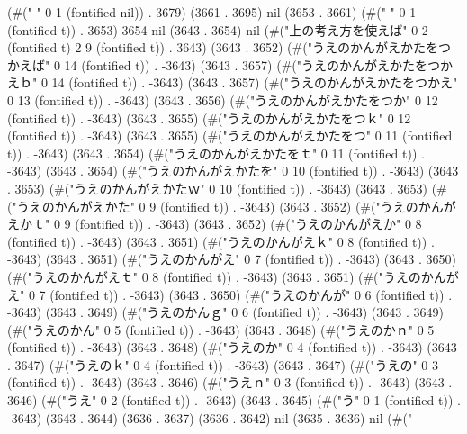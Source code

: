 (#("	" 0 1 (fontified nil)) . 3679) (3661 . 3695) nil (3653 . 3661) (#(" " 0 1 (fontified t)) . 3653) 3654 nil (3643 . 3654) nil (#("上の考え方を使えば" 0 2 (fontified t) 2 9 (fontified t)) . 3643) (3643 . 3652) (#("うえのかんがえかたをつかえば" 0 14 (fontified t)) . -3643) (3643 . 3657) (#("うえのかんがえかたをつかえｂ" 0 14 (fontified t)) . -3643) (3643 . 3657) (#("うえのかんがえかたをつかえ" 0 13 (fontified t)) . -3643) (3643 . 3656) (#("うえのかんがえかたをつか" 0 12 (fontified t)) . -3643) (3643 . 3655) (#("うえのかんがえかたをつｋ" 0 12 (fontified t)) . -3643) (3643 . 3655) (#("うえのかんがえかたをつ" 0 11 (fontified t)) . -3643) (3643 . 3654) (#("うえのかんがえかたをｔ" 0 11 (fontified t)) . -3643) (3643 . 3654) (#("うえのかんがえかたを" 0 10 (fontified t)) . -3643) (3643 . 3653) (#("うえのかんがえかたｗ" 0 10 (fontified t)) . -3643) (3643 . 3653) (#("うえのかんがえかた" 0 9 (fontified t)) . -3643) (3643 . 3652) (#("うえのかんがえかｔ" 0 9 (fontified t)) . -3643) (3643 . 3652) (#("うえのかんがえか" 0 8 (fontified t)) . -3643) (3643 . 3651) (#("うえのかんがえｋ" 0 8 (fontified t)) . -3643) (3643 . 3651) (#("うえのかんがえ" 0 7 (fontified t)) . -3643) (3643 . 3650) (#("うえのかんがえｔ" 0 8 (fontified t)) . -3643) (3643 . 3651) (#("うえのかんがえ" 0 7 (fontified t)) . -3643) (3643 . 3650) (#("うえのかんが" 0 6 (fontified t)) . -3643) (3643 . 3649) (#("うえのかんｇ" 0 6 (fontified t)) . -3643) (3643 . 3649) (#("うえのかん" 0 5 (fontified t)) . -3643) (3643 . 3648) (#("うえのかｎ" 0 5 (fontified t)) . -3643) (3643 . 3648) (#("うえのか" 0 4 (fontified t)) . -3643) (3643 . 3647) (#("うえのｋ" 0 4 (fontified t)) . -3643) (3643 . 3647) (#("うえの" 0 3 (fontified t)) . -3643) (3643 . 3646) (#("うえｎ" 0 3 (fontified t)) . -3643) (3643 . 3646) (#("うえ" 0 2 (fontified t)) . -3643) (3643 . 3645) (#("う" 0 1 (fontified t)) . -3643) (3643 . 3644) (3636 . 3637) (3636 . 3642) nil (3635 . 3636) nil (#("
